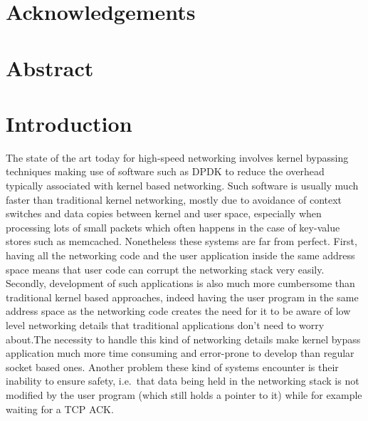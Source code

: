 \documentclass[11pt]{book}
\newcommand{\marios}[1]{\noindent{{\bf \fbox{MK:} {\textcolor{green}{\it#1}}}}}
\begin{document}
\chapter*{Acknowledgements}
\chapter*{Abstract}
\marios{You need a short abstract that describes the problem, hints the solutions and gives some basic performance numbers.}

\tableofcontents

\listoftodos{}

\setcounter{page}{1}
\chapter{Introduction}

The state of the art today for high-speed networking involves kernel
bypassing techniques making use of software such as DPDK to reduce the
overhead typically associated with kernel based networking. Such
software is usually much faster than traditional kernel networking,
mostly due to avoidance of context switches and data copies between
kernel and user space, especially when processing lots of small
packets which often happens in the case of key-value stores such as
memcached. Nonetheless these systems are far from perfect. First,
having all the  networking code and the user application inside the
same address space means that user code can corrupt the networking
stack very easily. Secondly, development of such applications is also
much more cumbersome than traditional kernel based approaches, indeed
having the user program in the same address space as the networking
code creates the need for it to be aware of low level networking
details that traditional applications don't need to worry about.The
necessity to handle this kind of networking details make kernel bypass
application much more time consuming and error-prone to develop than
regular socket based ones. Another problem these kind of systems
encounter is their inability to ensure safety, i.e.\ that data being
held in the networking stack is not modified by the user program
(which still holds a pointer to it) while for example waiting for a
TCP ACK.

\marios{You need a flat abstract without subsection where you clearly state the problem. "We need to eliminate copies in a KV-store's datapath. Thus we use language features to reason about data onwership." You mention that we use Rust for that without any details. You mention that the solution is for reliable transport protocols and we use R2P2 without getting into details. And then you state some basic performance numbers.}
\end{document}
